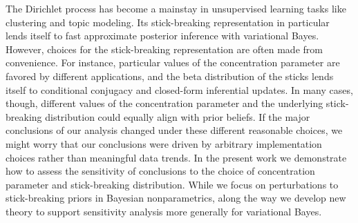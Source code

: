 
The Dirichlet process has become a mainstay in unsupervised learning tasks
like clustering and topic modeling. Its stick-breaking representation in particular lends itself
to fast approximate posterior inference with variational Bayes. However, choices for the
stick-breaking representation are often made from convenience. For instance, particular
values of the concentration parameter are favored by different applications, and the beta
distribution of the sticks lends itself to conditional conjugacy and closed-form inferential updates.
In many cases, though, different values of the concentration parameter and the underlying stick-breaking
distribution could equally align with prior beliefs. If the major conclusions of our analysis changed under these different reasonable choices, we might worry that our conclusions were driven by arbitrary implementation choices rather than meaningful data trends.
In the present work we demonstrate how to assess the sensitivity of conclusions
to the choice of concentration parameter and stick-breaking distribution. While we focus on perturbations to stick-breaking priors in Bayesian nonparametrics, along the way we develop new theory to support sensitivity analysis more generally for variational Bayes.